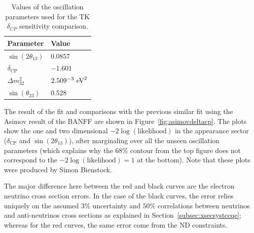 \begin{table}[ht]
  \center
  \begin{tabular}{ll}
    \toprule
    Parameter            & Value \\
    \midrule
    $\sin(2\theta_{13})$ & $0.0857$ \\
    $\delta_{\text{CP}}$  & $-1.601$\\
    $\Delta m^2_{32}$    & $2.509\time10^{-3}~\text{eV}^2$\\
    $\sin(\theta_{23})$  & $0.528$\\ 
    \bottomrule
  \end{tabular}
  \caption[Values of the oscillation parameters used for the T2K
  $\delta_{CP}$ sensitivity comparison]{Values of the oscillation
    parameters used for the \Gls{TK} $\delta_{CP}$ sensitivity
    comparison.}
  \label{tab:oscparamA}
\end{table}

The result of the fit and comparisons with the previous similar fit
using the \Gls{Asimov} result of the \Gls{BANFF} are shown in
Figure~\ref{fig:asimovdeltacp}. The plots show the one and two
dimensional $-2\log(\text{likelihood})$ in the appearance sector
($\delta_{\text{CP}}$ and $\sin(2\theta_{13})$), after marginaling
over all the unseen oscillation parameters (which explains why the
$68\%$ contour from the top figure does not correspond to the
$-2\log(\text{likelihood}) = 1$ at the bottom). Note that these plots
were produced by Simon Bienstock.

The major difference here between the red and black curves are the
electron neutrino cross section errors. In the case of the black
curves, the error relies uniquely on the assumed $3\%$ uncertainty and
$50\%$ correlations between neutrinos and anti-neutrinos cross
sections as explained in Section~\ref{subsec:xsecsystccqe}; whereas
for the red curves, the same error come from the \Gls{ND} constraints.

